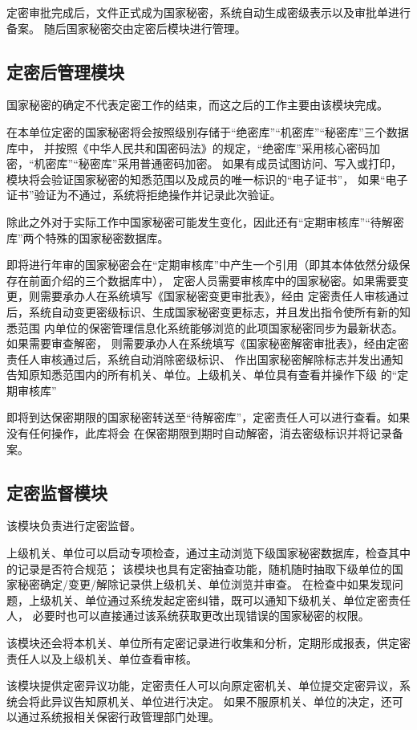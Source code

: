 定密审批完成后，文件正式成为国家秘密，系统自动生成密级表示以及审批单进行备案。
随后国家秘密交由定密后模块进行管理。

\subsection{定密后管理模块}
国家秘密的确定不代表定密工作的结束，而这之后的工作主要由该模块完成。

在本单位定密的国家秘密将会按照级别存储于“绝密库”“机密库”“秘密库”三个数据库中，
并按照《中华人民共和国密码法》的规定，“绝密库”采用核心密码加密，“机密库”“秘密库”采用普通密码加密。
如果有成员试图访问、写入或打印，模块将会验证国家秘密的知悉范围以及成员的唯一标识的“电子证书”，
如果“电子证书”验证为不通过，系统将拒绝操作并记录此次验证。

除此之外对于实际工作中国家秘密可能发生变化，因此还有“定期审核库”“待解密库”两个特殊的国家秘密数据库。

即将进行年审的国家秘密会在“定期审核库”中产生一个引用（即其本体依然分级保存在前面介绍的三个数据库中），
定密人员需要审核库中的国家秘密。如果需要变更，则需要承办人在系统填写《国家秘密变更审批表》，经由
定密责任人审核通过后，系统自动变更密级标识、生成国家秘密变更标志，并且发出指令使所有新的知悉范围
内单位的保密管理信息化系统能够浏览的此项国家秘密同步为最新状态。如果需要审查解密，
则需要承办人在系统填写《国家秘密解密审批表》，经由定密责任人审核通过后，系统自动消除密级标识、
作出国家秘密解除标志并发出通知告知原知悉范围内的所有机关、单位。上级机关、单位具有查看并操作下级
的“定期审核库”

即将到达保密期限的国家秘密转送至“待解密库”，定密责任人可以进行查看。如果没有任何操作，此库将会
在保密期限到期时自动解密，消去密级标识并将记录备案。

\subsection{定密监督模块}
该模块负责进行定密监督。

上级机关、单位可以启动专项检查，通过主动浏览下级国家秘密数据库，检查其中的记录是否符合规范；
该模块也具有定密抽查功能，随机随时抽取下级单位的国家秘密确定/变更/解除记录供上级机关、单位浏览并审查。
在检查中如果发现问题，上级机关、单位通过系统发起定密纠错，既可以通知下级机关、单位定密责任人，
必要时也可以直接通过该系统获取更改出现错误的国家秘密的权限。

该模块还会将本机关、单位所有定密记录进行收集和分析，定期形成报表，供定密责任人以及上级机关、单位查看审核。

该模块提供定密异议功能，定密责任人可以向原定密机关、单位提交定密异议，系统会将此异议告知原机关、单位进行决定。
如果不服原机关、单位的决定，还可以通过系统报相关保密行政管理部门处理。

